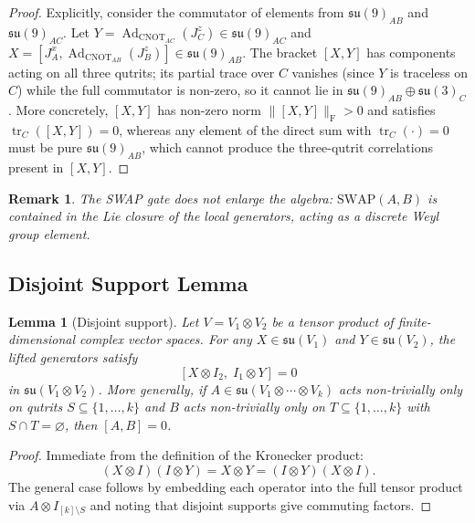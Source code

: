 \documentclass[12pt,a4paper]{article}
\newtheorem{lemma}[theorem]{Lemma}
\newtheorem{remark}[theorem]{Remark}
\newcommand{\Ad}{\operatorname{Ad}}
\begin{document}
\begin{proof}
Explicitly, consider the commutator of elements from
$\mathfrak{su}(9)_{AB}$ and $\mathfrak{su}(9)_{AC}$. Let
$Y = \Ad_{\text{CNOT}_{AC}}(J^z_C) \in \mathfrak{su}(9)_{AC}$ and
$X = [J^x_A, \Ad_{\text{CNOT}_{AB}}(J^z_B)] \in \mathfrak{su}(9)_{AB}$.
The bracket $[X,Y]$ has components acting on all three qutrits;
its partial trace over $C$ vanishes (since $Y$ is traceless on $C$)
while the full commutator is non-zero, so it cannot lie in
$\mathfrak{su}(9)_{AB} \oplus \mathfrak{su}(3)_C$.
More concretely, $[X,Y]$ has non-zero norm
$\bigl\|[X,Y]\bigr\|_{\mathrm{F}} > 0$ and satisfies
$\operatorname{tr}_C([X,Y]) = 0$, whereas any element of the direct sum
with $\operatorname{tr}_C(\cdot)=0$ must be pure $\mathfrak{su}(9)_{AB}$,
which cannot produce the three-qutrit correlations present in $[X,Y]$.
\end{proof}

\begin{remark}
The SWAP gate does not enlarge the algebra: $\text{SWAP}(A,B)$ is
contained in the Lie closure of the local generators, acting as a
discrete Weyl group element.
\end{remark}

\subsection{Disjoint Support Lemma}
\label{sec:disjoint}

\begin{lemma}[Disjoint support]
\label{lemma:disjoint}
Let $V = V_1 \otimes V_2$ be a tensor product of finite-dimensional
complex vector spaces. For any $X \in \mathfrak{su}(V_1)$ and
$Y \in \mathfrak{su}(V_2)$, the lifted generators satisfy
\[
[X \otimes I_2,\; I_1 \otimes Y] = 0
\]
in $\mathfrak{su}(V_1 \otimes V_2)$. More generally, if
$A \in \mathfrak{su}(V_1 \otimes \cdots \otimes V_k)$ acts
non-trivially only on qutrits $S \subseteq \{1,\dots,k\}$ and
$B$ acts non-trivially only on $T \subseteq \{1,\dots,k\}$ with
$S \cap T = \varnothing$, then $[A,B] = 0$.
\end{lemma}

\begin{proof}
Immediate from the definition of the Kronecker product:
\[
(X \otimes I)(I \otimes Y) = X \otimes Y = (I \otimes Y)(X \otimes I).
\]
The general case follows by embedding each operator into the full tensor
product via $A \otimes I_{[k]\setminus S}$ and noting that disjoint
supports give commuting factors.
\end{proof}
\end{document}

